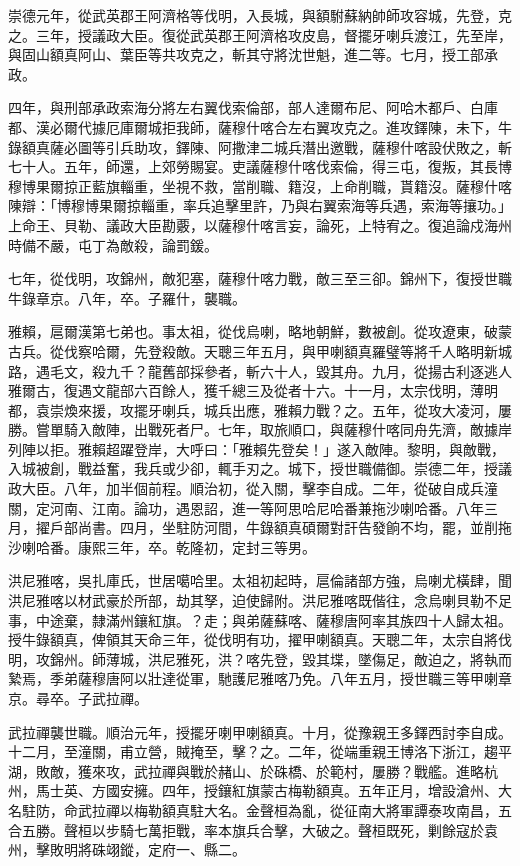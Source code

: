 \begin{pinyinscope}
崇德元年，從武英郡王阿濟格等伐明，入長城，與額駙蘇納帥師攻容城，先登，克之。三年，授議政大臣。復從武英郡王阿濟格攻皮島，督擺牙喇兵渡江，先至岸，與固山額真阿山、葉臣等共攻克之，斬其守將沈世魁，進二等。七月，授工部承政。

四年，與刑部承政索海分將左右翼伐索倫部，部人達爾布尼、阿哈木都戶、白庫都、漢必爾代據厄庫爾城拒我師，薩穆什喀合左右翼攻克之。進攻鐸陳，未下，牛錄額真薩必圖等引兵助攻，鐸陳、阿撒津二城兵潛出邀戰，薩穆什喀設伏敗之，斬七十人。五年，師還，上郊勞賜宴。吏議薩穆什喀伐索倫，得三屯，復叛，其長博穆博果爾掠正藍旗輜重，坐視不救，當削職、籍沒，上命削職，貰籍沒。薩穆什喀陳辯：「博穆博果爾掠輜重，率兵追擊里許，乃與右翼索海等兵遇，索海等攘功。」上命王、貝勒、議政大臣勘覈，以薩穆什喀言妄，論死，上特宥之。復追論戍海州時備不嚴，屯丁為敵殺，論罰鍰。

七年，從伐明，攻錦州，敵犯塞，薩穆什喀力戰，敵三至三卻。錦州下，復授世職牛錄章京。八年，卒。子羅什，襲職。

雅賴，扈爾漢第七弟也。事太祖，從伐烏喇，略地朝鮮，數被創。從攻遼東，破蒙古兵。從伐察哈爾，先登殺敵。天聰三年五月，與甲喇額真羅璧等將千人略明新城路，遇毛文，殺九千？龍舊部採參者，斬六十人，毀其舟。九月，從揚古利逐逃人雅爾古，復遇文龍部六百餘人，獲千總三及從者十六。十一月，太宗伐明，薄明都，袁崇煥來援，攻擺牙喇兵，城兵出應，雅賴力戰？之。五年，從攻大凌河，屢勝。嘗單騎入敵陣，出戰死者尸。七年，取旅順口，與薩穆什喀同舟先濟，敵據岸列陣以拒。雅賴超躍登岸，大呼曰：「雅賴先登矣！」遂入敵陣。黎明，與敵戰，入城被創，戰益奮，我兵或少卻，輒手刃之。城下，授世職備御。崇德二年，授議政大臣。八年，加半個前程。順治初，從入關，擊李自成。二年，從破自成兵潼關，定河南、江南。論功，遇恩詔，進一等阿思哈尼哈番兼拖沙喇哈番。八年三月，擢戶部尚書。四月，坐駐防河間，牛錄額真碩爾對訐告發餉不均，罷，並削拖沙喇哈番。康熙三年，卒。乾隆初，定封三等男。

洪尼雅喀，吳扎庫氏，世居噶哈里。太祖初起時，扈倫諸部方強，烏喇尤橫肆，聞洪尼雅喀以材武豪於所部，劫其孥，迫使歸附。洪尼雅喀既偕往，念烏喇貝勒不足事，中途棄，隸滿州鑲紅旗。？走；與弟薩蘇喀、薩穆唐阿率其族四十人歸太祖。授牛錄額真，俾領其天命三年，從伐明有功，擢甲喇額真。天聰二年，太宗自將伐明，攻錦州。師薄城，洪尼雅死，洪？喀先登，毀其堞，墜傷足，敵迫之，將執而縶焉，季弟薩穆唐阿以壯達從軍，馳護尼雅喀乃免。八年五月，授世職三等甲喇章京。尋卒。子武拉禪。

武拉禪襲世職。順治元年，授擺牙喇甲喇額真。十月，從豫親王多鐸西討李自成。十二月，至潼關，甫立營，賊掩至，擊？之。二年，從端重親王博洛下浙江，趨平湖，敗敵，獲來攻，武拉禪與戰於赭山、於硃橋、於範村，屢勝？戰艦。進略杭州，馬士英、方國安擁。四年，授鑲紅旗蒙古梅勒額真。五年正月，增設滄州、大名駐防，命武拉禪以梅勒額真駐大名。金聲桓為亂，從征南大將軍譚泰攻南昌，五合五勝。聲桓以步騎七萬拒戰，率本旗兵合擊，大破之。聲桓既死，剿餘寇於袁州，擊敗明將硃翊鏦，定府一、縣二。


\end{pinyinscope}
